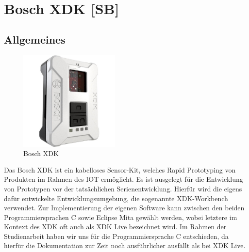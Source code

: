 \section{Bosch \acf{XDK} [SB]}\label{sec:Bosch XDK}
\subsection{Allgemeines}\label{subsec:Allgemeines}
\begin{figure}[H]
	\centering
	\includegraphics[width=5cm]{images/xdk.jpg}	
	\caption{Bosch \acs*{XDK}}
	\label{fig:XDK}
\end{figure}
Das Bosch \acf{XDK} ist ein kabelloses Sensor-Kit, welches Rapid Prototyping von Produkten im Rahmen des \acf{IOT} ermöglicht. Es ist ausgelegt für die Entwicklung von Prototypen vor der tatsächlichen Serienentwicklung. 
Hierfür wird die eigens dafür entwickelte Entwicklungsumgebung, die sogenannte XDK-Workbench verwendet. Zur Implementierung der eigenen Software kann zwischen den beiden Programmiersprachen C sowie Eclipse Mita gewählt werden, wobei letztere im Kontext des XDK oft auch als XDK Live bezeichnet wird. Im Rahmen der Studienarbeit haben wir uns für die Programmiersprache C entschieden, da hierfür die Dokumentation zur Zeit noch ausführlicher ausfällt als bei XDK Live.\newline
~\cite{XDK.General}
